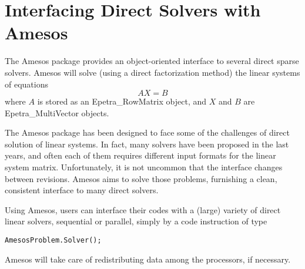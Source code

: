 % 
% 
% 
%   
%   
% 
% 

\chapter{Interfacing Direct Solvers with Amesos}
\label{chap:amesos}

The Amesos package provides an object-oriented interface to several
direct sparse solvers. Amesos will solve (using a direct factorization
method) the linear systems of equations
\begin{equation}
\label{eq:amesos_ls}
A X = B
\end{equation}
where $A$ is stored as an Epetra\_RowMatrix object, and $X$ and $B$ are
Epetra\_MultiVector objects.

The Amesos package has been designed to face some of the challenges of
direct solution of linear systems. In fact, many solvers have been
proposed in the last years, and often each of them requires different
input formats for the linear system matrix. Unfortunately, it is not
uncommon that the interface changes between revisions. Amesos aims to
solve those problems, furnishing a clean, consistent interface to many
direct solvers.

Using Amesos, users can interface their codes with a (large) variety of
direct linear solvers, sequential or parallel, simply by a code
instruction of type
\begin{verbatim}
AmesosProblem.Solver();
\end{verbatim}
Amesos will take care of redistributing data among the processors, if
necessary.

